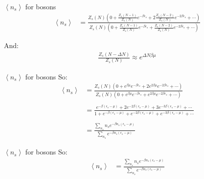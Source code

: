 \documentclass{beamer}
\begin{document}
\begin{frame}{$\left<n_s\right>$ for bosons}
	\begin{align*}
		\left<n_s\right>
		&=\frac{Z_s(N)\left(0+\frac{Z_s(N-1)}{Z_s(N)}e^{-\beta \epsilon_s}+2\frac{Z_s(N-2)}{Z_s(N)}e^{-2\beta\epsilon_s}+\cdots\right)}{Z_s(N)\left(0+\frac{Z_s(N-1)}{Z_s(N)}e^{-\beta \epsilon_s}+\frac{Z_s(N-2)}{Z_s(N)}e^{-2\beta\epsilon_s}+\cdots\right)}
	\end{align*}

And:
\begin{align*}
	\frac{Z_s(N-\Delta N)}{Z_s(N)}\approx e^{\Delta N\beta \mu}
\end{align*}
	
\end{frame}





\begin{frame}{$\left<n_s\right>$ for bosons}
	So:
	\begin{align*}
		\left<n_s\right>
		&=\frac{Z_s(N)\left(0+e^{\beta \mu}e^{-\beta \epsilon_s}+2e^{2\beta\mu}e^{-2\beta\epsilon_s}+\cdots\right)}{Z_s(N)\left(0+e^{\beta\mu}e^{-\beta \epsilon_s}+e^{2\beta\mu}e^{-2\beta\epsilon_s}+\cdots\right)}\\\\
		&=\frac{e^{-\beta\left(\epsilon_s-\mu\right)}+2e^{-2\beta\left(\epsilon_s-\mu\right)}+3e^{-3\beta\left(\epsilon_s-\mu\right)}+\cdots}{1+e^{-\beta\left(\epsilon_s-\mu\right)}+e^{-2\beta\left(\epsilon_s-\mu\right)}+e^{-3\beta\left(\epsilon_s-\mu\right)}+\cdots}\\\\
		&=\frac{\sum_{n_s}n_se^{-\beta n_s\left(\epsilon_s-\mu\right)}}{\sum_{n_s}e^{-\beta n_s\left(\epsilon_s-\mu\right)}}
	\end{align*}
	
	
\end{frame}





\begin{frame}{$\left<n_s\right>$ for bosons}
	So:
	\begin{align*}
		\left<n_s\right>
		&=\frac{\sum_{n_s}n_se^{-\beta n_s\left(\epsilon_s-\mu\right)}}{\sum_{n_s}e^{-\beta n_s\left(\epsilon_s-\mu\right)}}
	\end{align*}
	
	
\end{frame}
\end{document}
